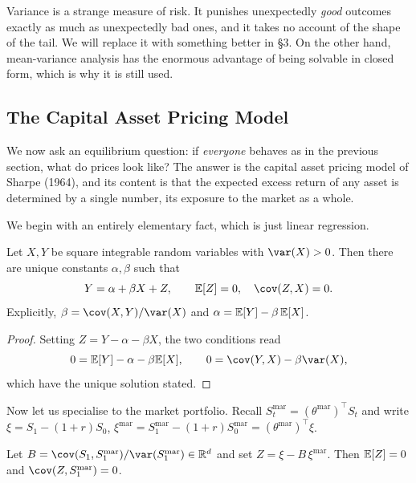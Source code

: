 \documentclass[a4paper]{scrartcl}
\begin{document}
\begin{remark}
	Variance is a strange measure of risk. It punishes unexpectedly \emph{good} outcomes exactly as much as unexpectedly bad ones, and it takes no account of the shape of the tail. We will replace it with something better in \S3. On the other hand, mean-variance analysis has the enormous advantage of being solvable in closed form, which is why it is still used.
\end{remark}

\subsection{The Capital Asset Pricing Model}

We now ask an equilibrium question: if \emph{everyone} behaves as in the previous section, what do prices look like? The answer is the capital asset pricing model of Sharpe (1964), and its content is that the expected excess return of any asset is determined by a single number, its exposure to the market as a whole.

We begin with an entirely elementary fact, which is just linear regression.

\begin{proposition}\label{prop:regression}
	Let $X, Y$ be square integrable random variables with $\var(X) > 0$. Then there are unique constants $\alpha, \beta$ such that
	$$
	Y = \alpha + \beta X + Z, \qquad \EE[Z] = 0, \quad \cov(Z,X) = 0.
	$$
	Explicitly, $\beta = \cov(X,Y)/\var(X)$ and $\alpha = \mathbb{E}[Y] - \beta\,\mathbb{E}[X]$.
\end{proposition}

\begin{proof}
	Setting $Z = Y - \alpha - \beta X$, the two conditions read
	$$
	0 = \EE[Y] - \alpha - \beta \EE[X], \qquad 0 = \cov(Y,X) - \beta\var(X),
	$$
	which have the unique solution stated.
\end{proof}

Now let us specialise to the market portfolio. Recall $S^{\mathrm{mar}}_t = (\theta^{\mathrm{mar}})^\top S_t$ and write $\xi = S_1 - (1+r)S_0$, $\xi^{\mathrm{mar}} = S_1^{\mathrm{mar}} - (1+r)S_0^{\mathrm{mar}} = (\theta^{\mathrm{mar}})^\top \xi$.

\begin{theorem}\label{thm:capm-vector}
	Let $B = \cov(S_1, S_1^{\mathrm{mar}})/\var(S_1^{\mathrm{mar}}) \in \R^d$ and set $Z = \xi - B\,\xi^{\mathrm{mar}}$. Then $\mathbb{E}[Z] = 0$ and $\cov(Z, S_1^{\mathrm{mar}}) = 0$.
\end{theorem}
\end{document}
